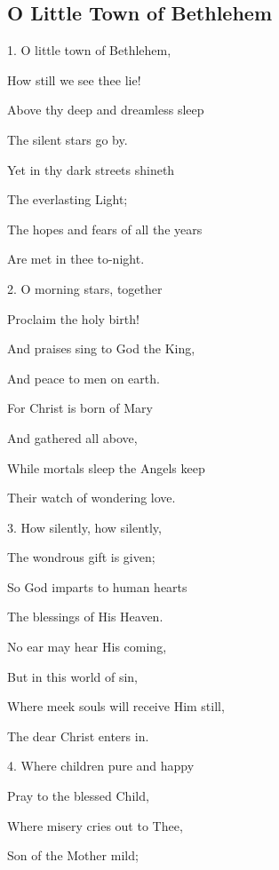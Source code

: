 \subsection{O Little Town of Bethlehem}\label{o_little_town_of_bethlehem}
\begin{description}[nosep,leftmargin=\parindent,labelsep=0pt]
\item 1. O little town of Bethlehem, 
\item How still we see thee lie! 
\item Above thy deep and dreamless sleep 
\item The silent stars go by. 
\item Yet in thy dark streets shineth 
\item The everlasting Light; 
\item The hopes and fears of all the years 
\item Are met in thee to-night. 
\vspace{1.5ex}
\item 2. O morning stars, together 
\item Proclaim the holy birth! 
\item And praises sing to God the King, 
\item And peace to men on earth. 
\item For Christ is born of Mary 
\item And gathered all above, 
\item While mortals sleep the Angels keep 
\item Their watch of wondering love. 
\vspace{1.5ex}
\item 3. How silently, how silently, 
\item The wondrous gift is given; 
\item So God imparts to human hearts 
\item The blessings of His Heaven. 
\item No ear may hear His coming, 
\item But in this world of sin, 
\item Where meek souls will receive Him still, 
\item The dear Christ enters in. 
\vspace{1.5ex}
\item 4. Where children pure and happy 
\item Pray to the blessed Child, 
\item Where misery cries out to Thee, 
\item Son of the Mother mild; 

\end{description}
